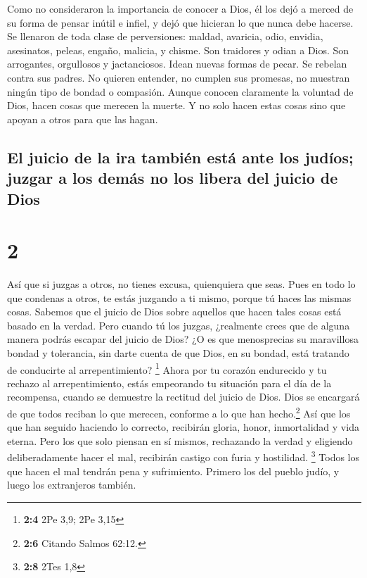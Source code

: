  Como no consideraron la importancia de conocer a Dios,
él los dejó a merced de su forma de pensar inútil e infiel, y dejó que
hicieran lo que nunca debe hacerse.  Se llenaron de toda
clase de perversiones: maldad, avaricia, odio, envidia, asesinatos,
peleas, engaño, malicia, y chisme.  Son traidores y odian
a Dios. Son arrogantes, orgullosos y jactanciosos. Idean nuevas formas
de pecar. Se rebelan contra sus padres.  No quieren
entender, no cumplen sus promesas, no muestran ningún tipo de bondad o
compasión.  Aunque conocen claramente la voluntad de
Dios, hacen cosas que merecen la muerte. Y no solo hacen estas cosas
sino que apoyan a otros para que las hagan.

\hypertarget{el-juicio-de-la-ira-tambiuxe9n-estuxe1-ante-los-juduxedos-juzgar-a-los-demuxe1s-no-los-libera-del-juicio-de-dios}{%
\subsection{El juicio de la ira también está ante los judíos; juzgar a
los demás no los libera del juicio de
Dios}\label{el-juicio-de-la-ira-tambiuxe9n-estuxe1-ante-los-juduxedos-juzgar-a-los-demuxe1s-no-los-libera-del-juicio-de-dios}}

\hypertarget{section-1}{%
\section{2}\label{section-1}}

 Así que si juzgas a otros, no tienes excusa, quienquiera
que seas. Pues en todo lo que condenas a otros, te estás juzgando a ti
mismo, porque tú haces las mismas cosas.  Sabemos que el
juicio de Dios sobre aquellos que hacen tales cosas está basado en la
verdad.  Pero cuando tú los juzgas, ¿realmente crees que
de alguna manera podrás escapar del juicio de Dios?  ¿O es
que menosprecias su maravillosa bondad y tolerancia, sin darte cuenta de
que Dios, en su bondad, está tratando de conducirte al arrepentimiento?
\footnote{\textbf{2:4} 2Pe 3,9; 2Pe 3,15}  Ahora por tu
corazón endurecido y tu rechazo al arrepentimiento, estás empeorando tu
situación para el día de la recompensa, cuando se demuestre la rectitud
del juicio de Dios.  Dios se encargará de que todos
reciban lo que merecen, conforme a lo que han hecho.\footnote{\textbf{2:6}
  Citando Salmos 62:12.}  Así que los que han seguido
haciendo lo correcto, recibirán gloria, honor, inmortalidad y vida
eterna.  Pero los que solo piensan en sí mismos,
rechazando la verdad y eligiendo deliberadamente hacer el mal, recibirán
castigo con furia y hostilidad. \footnote{\textbf{2:8} 2Tes 1,8}
 Todos los que hacen el mal tendrán pena y sufrimiento.
Primero los del pueblo judío, y luego los extranjeros también.


